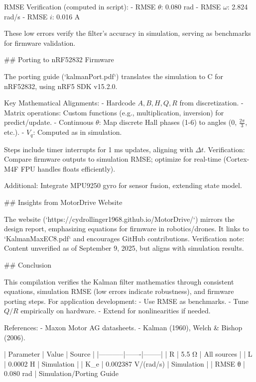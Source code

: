 RMSE Verification (computed in script):
- RMSE \( \theta \): 0.080 rad
- RMSE \( \omega \): 2.824 rad/s
- RMSE \( i \): 0.016 A

These low errors verify the filter's accuracy in simulation, serving as benchmarks for firmware validation.

## Porting to nRF52832 Firmware

The porting guide (`kalmanPort.pdf`) translates the simulation to C for nRF52832, using nRF5 SDK v15.2.0.

Key Mathematical Alignments:
- Hardcode \( A, B, H, Q, R \) from discretization.
- Matrix operations: Custom functions (e.g., multiplication, inversion) for predict/update.
- Continuous \( \theta \): Map discrete Hall phases (1-6) to angles (0, \( \frac{2\pi}{3} \), etc.).
- \( V_q \): Computed as in simulation.

Steps include timer interrupts for 1 ms updates, aligning with \( \Delta t \). Verification: Compare firmware outputs to simulation RMSE; optimize for real-time (Cortex-M4F FPU handles floats efficiently).

Additional: Integrate MPU9250 gyro for sensor fusion, extending state model.

## Insights from MotorDrive Website

The website (`https://cydrollinger1968.github.io/MotorDrive/`) mirrors the design report, emphasizing equations for firmware in robotics/drones. It links to `KalmanMaxEC8.pdf` and encourages GitHub contributions. Verification note: Content unverified as of September 9, 2025, but aligns with simulation results.

## Conclusion

This compilation verifies the Kalman filter mathematics through consistent equations, simulation RMSE (low errors indicate robustness), and firmware porting steps. For application development:
- Use RMSE as benchmarks.
- Tune \( Q/R \) empirically on hardware.
- Extend for nonlinearities if needed.

References:
- Maxon Motor AG datasheets.
- Kalman (1960), Welch & Bishop (2006).

| Parameter | Value | Source |
|-----------|-------|--------|
| R | 5.5 Ω | All sources |
| L | 0.0002 H | Simulation |
| K_e | 0.002387 V/(rad/s) | Simulation |
| RMSE θ | 0.080 rad | Simulation/Porting Guide